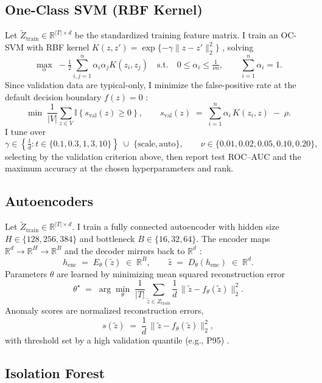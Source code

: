 \documentclass[11pt]{article}
\newcommand{\R}{\mathbb{R}}
\newcommand{\Ind}[1]{\mathbb{I}\!\left\{ #1 \right\}}
\begin{document}
\subsection{One-Class SVM (RBF Kernel)}

Let \(\tilde{Z}_{\text{train}}\in\R^{|T|\times d}\) be the standardized training feature matrix. I train an OC-SVM with RBF kernel \(K(z,z')=\exp\{-\gamma\lVert z-z'\rVert_2^2\}\) \parencite{Scholkopf2001,TaxDuin2004}, solving
\[
\max_{\alpha}\; -\tfrac{1}{2} \sum_{i,j=1}^{n} \alpha_i \alpha_j K(z_i, z_j)
\quad \text{s.t.} \quad
0 \leq \alpha_i \leq \tfrac{1}{\nu n}, \qquad
\sum_{i=1}^{n} \alpha_i = 1.
\]
Since validation data are typical-only, I minimize the false-positive rate at the default decision boundary \(f(z)=0\) \parencite{Scholkopf2001,TaxDuin2004,Chandola2009,Campos2016,Ruff2021}:
\[
\min \; \frac{1}{|V|} \sum_{z \in V} \Ind{ s_{\text{val}}(z) \ge 0 },
\qquad
s_{\text{val}}(z) \;=\; \sum_{i=1}^{n} \alpha_i\, K(z_i, z) \;-\; \rho .
\]
I tune over
\[
\gamma \in \left\{ \tfrac{t}{d} : t \in \{0.1, 0.3, 1, 3, 10\} \right\}
\;\cup\; \{\text{scale}, \text{auto}\}, \qquad
\nu \in \{0.01, 0.02, 0.05, 0.10, 0.20\},
\]
selecting by the validation criterion above, then report test ROC–AUC and the maximum accuracy at the chosen hyperparameters and rank.

\subsection{Autoencoders}

Let \(\tilde{Z}_{\text{train}}\in\R^{|T|\times d}\). I train a fully connected autoencoder with hidden size \(H\in\{128,256,384\}\) and bottleneck \(B\in\{16,32,64\}\). The encoder maps \(\R^{d}\!\to\!\R^{H}\!\to\!\R^{B}\) and the decoder mirrors back to \(\R^{d}\) \parencite{Hinton2006,Goodfellow2016}:
\[
h_{\text{enc}} \;=\; E_{\theta}(\tilde{z}) \;\in\; \R^{B},\qquad
\hat{z} \;=\; D_{\theta}(h_{\text{enc}}) \;\in\; \R^{d}.
\]
Parameters \(\theta\) are learned by minimizing mean squared reconstruction error
\[
\theta^{\star}
\;=\;
\arg\min_{\theta}\;
\frac{1}{|T|}\sum_{\tilde{z}\in Z_{\text{train}}}
\frac{1}{d}\,\big\lVert \tilde{z} - f_{\theta}(\tilde{z}) \big\rVert_{2}^{2}.
\]
Anomaly scores are normalized reconstruction errors,
\[
s(\tilde{z}) \;=\; \frac{1}{d}\,\big\lVert \tilde{z} - f_{\theta}(\tilde{z}) \big\rVert_{2}^{2},
\]
with threshold set by a high validation quantile (e.g., P95) \parencite{Chandola2009,Campos2016,Ruff2021}.

\subsection{Isolation Forest}
\end{document}
